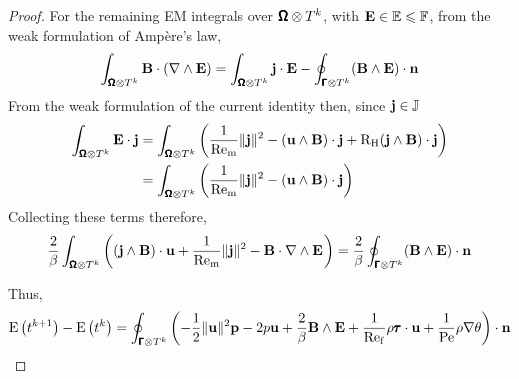 \begin{proof}
        For the remaining EM integrals over $\pmb{\mathsf{\Omega}}\otimes T^{k}$, with $\mathbf{E}  \in  \mathbb{E}  \leqslant  \mathbb{F}$, from the weak formulation of Ampère's law,
        \begin{equation}
            \int_{\pmb{\mathsf{\Omega}}\otimes T^{k}}\mathbf{B}\cdot(\nabla\wedge\mathbf{E})  =  \int_{\pmb{\mathsf{\Omega}}\otimes T^{k}}\mathbf{j}\cdot\mathbf{E} - \oint_{\pmb{\mathsf{\Gamma}}\otimes T^{k}}(\mathbf{B}\wedge\mathbf{E})\cdot\mathbf{n}
        \end{equation}
        From the weak formulation of the current identity then, since $\mathbf{j}  \in  \mathbb{J}$
        \begin{align}
            \int_{\pmb{\mathsf{\Omega}}\otimes T^{k}}\mathbf{E}\cdot\mathbf{j}  &=  \int_{\pmb{\mathsf{\Omega}}\otimes T^{k}}\left(\frac{1}{\mathrm{Re}_{\mathrm{m}}}\|\mathbf{j}\|^{2} - (\mathbf{u}\wedge\mathbf{B})\cdot\mathbf{j} + \mathrm{R}_{\mathrm{H}}(\mathbf{j}\wedge\mathbf{B})\cdot\mathbf{j}\right)  \\
            &=  \int_{\pmb{\mathsf{\Omega}}\otimes T^{k}}\left(\frac{1}{\mathrm{Re}_{\mathrm{m}}}\|\mathbf{j}\|^{2} - (\mathbf{u}\wedge\mathbf{B})\cdot\mathbf{j}\right)
        \end{align}
        Collecting these terms therefore,
        \begin{equation}
            \frac{2}{\beta}\int_{\bfOmega\otimes T^{k}}\left((\bfj\wedge\bfB)\cdot\bfu + \frac{1}{\rmRem}\|\bfj\|^{2} - \bfB\cdot\nabla\wedge\bfE\tall\right)  =  \frac{2}{\beta}\oint_{\bfGamma\otimes T^{k}}(\bfB\wedge\bfE)\cdot\bfn
        \end{equation}

        Thus,
        \begin{equation}
            \mathrm{E}\left(t^{k + 1}\right) - \mathrm{E}\left(t^{k}\right)  =  \oint_{\pmb{\mathsf{\Gamma}}\otimes T^{k}}\left(- \frac{1}{2}\|\mathbf{u}\|^{2}\mathbf{p} - 2p\mathbf{u} + \frac{2}{\beta}\mathbf{B}\wedge\mathbf{E} + \frac{1}{\mathrm{Re}_{\mathrm{f}}}\rho\pmb{\mathsf{\tau}}\cdot\mathbf{u} + \frac{1}{\mathrm{Pe}}\rho\nabla\theta\right)\cdot\mathbf{n}
        \end{equation}
    \end{proof}

    \line
    
